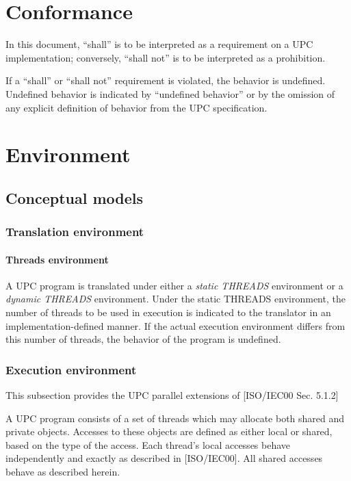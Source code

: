 
\section{Conformance}

\npf In this document, ``shall'' is to be interpreted as a
     requirement on a UPC implementation; conversely, ``shall not'' is to
     be interpreted as a prohibition.

\np  If a ``shall'' or ``shall not'' requirement 
     is violated, the behavior is undefined. Undefined behavior is
     indicated by ``undefined behavior'' or by the omission of any
     explicit definition of behavior from the UPC specification.

\pagebreak
\section{Environment}

\subsection{Conceptual models}
\subsubsection{Translation environment}

\paragraph{Threads environment}
\npf A UPC program is translated under either a {\em static
      THREADS} environment or a {\em dynamic THREADS} environment. Under
      the static THREADS environment, the number of threads to be
      used in execution is indicated to the translator in an
      implementation-defined manner. If the actual execution
      environment differs from this number of threads, the behavior of
      the program is undefined.
       
\subsubsection{Execution environment}

\npf This subsection provides the UPC parallel extensions of
   [ISO/IEC00 Sec. 5.1.2]
   
\np A UPC program consists of a set of threads which may
      allocate both shared and private objects.  
      Accesses to these objects are defined as either
      local or shared, based on the type of the access.  Each thread's local
      accesses behave independently and exactly as described in 
      [ISO/IEC00].  All shared accesses behave as described herein.

